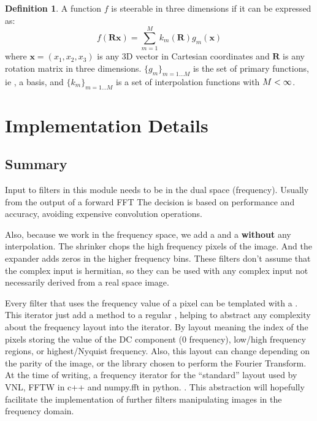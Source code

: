 \documentclass{InsightArticle}
\theoremstyle{definition}
\newtheorem{definition}{Definition}[section]
\begin{document}
\begin{definition}
A function $f$ is steerable in three dimensions if it can be expressed as:
\begin{equation}
  f(\bm{Rx}) = \sum_{m=1}^M k_m(\bm{R})g_m(\bm{x})
\end{equation}
where $\bm{x} = (x_1,x_2,x_3)$ is any 3D vector in Cartesian coordinates and $\bm{R}$ is any rotation matrix in three dimensions.
$\{g_m\}_{m=1...M}$ is the set of primary functions, ie , a basis, and $\{k_m\}_{m=1...M}$ is a set of interpolation functions with $M < \infty$.
\end{definition}

\section{Implementation Details}
\label{sec:Impl}
\subsection{Summary}
\label{sub:Summary}

Input to filters in this module needs to be in the dual space (frequency). Usually from the output of a forward FFT  The decision is based on performance and accuracy, avoiding expensive convolution operations.

Also, because we work in the frequency space, we add a  and a  \textbf{without} any interpolation. The shrinker chops the high frequency pixels of the image. And the expander adds zeros in the higher frequency bins. These filters don't assume that the complex input is hermitian, so they can be used with any complex input not necessarily derived from a real space image.

Every filter that uses the frequency value of a pixel can be templated with a .\newline
This iterator just add a method  to a regular , helping to abstract any complexity about the frequency layout into the iterator. By layout meaning the index of the pixels storing the value of the DC component (0 frequency), low/high frequency regions, or highest/Nyquist frequency. Also, this layout can change depending on the parity of the image, or the library chosen to perform the Fourier Transform. At the time of writing, a frequency iterator for the ``standard'' layout used by VNL, FFTW in c++ and numpy.fft in python. .\newline
This abstraction will hopefully facilitate the implementation of further filters manipulating images in the frequency domain.
\end{document}

